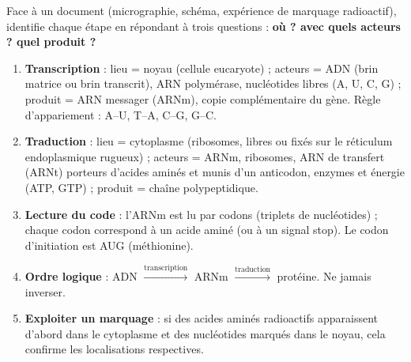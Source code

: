 \documentclass[11pt]{article}
\newcommand{\cle}[1]{{\popxbold\color{popdark}#1}}
\begin{document}
\begin{methode}
Face à un document (micrographie, schéma, expérience de marquage radioactif), identifie chaque étape en répondant à trois questions : \textbf{où ? avec quels acteurs ? quel produit ?}
\begin{enumerate}
\item \textbf{Transcription} : lieu = \cle{noyau} (cellule eucaryote) ; acteurs = ADN (brin matrice ou brin transcrit), \cle{ARN polymérase}, nucléotides libres (A, U, C, G) ; produit = \cle{ARN messager} (ARNm), copie complémentaire du gène. Règle d'appariement : A--U, T--A, C--G, G--C.
\item \textbf{Traduction} : lieu = \cle{cytoplasme} (ribosomes, libres ou fixés sur le réticulum endoplasmique rugueux) ; acteurs = ARNm, \cle{ribosomes}, \cle{ARN de transfert} (ARNt) porteurs d'acides aminés et munis d'un \cle{anticodon}, enzymes et énergie (ATP, GTP) ; produit = \cle{chaîne polypeptidique}.
\item \textbf{Lecture du code} : l'ARNm est lu par \cle{codons} (triplets de nucléotides) ; chaque codon correspond à un acide aminé (ou à un signal stop). Le codon d'initiation est AUG (méthionine).
\item \textbf{Ordre logique} : ADN $\xrightarrow{\text{transcription}}$ ARNm $\xrightarrow{\text{traduction}}$ protéine. Ne jamais inverser.
\item \textbf{Exploiter un marquage} : si des acides aminés radioactifs apparaissent d'abord dans le cytoplasme et des nucléotides marqués dans le noyau, cela confirme les localisations respectives.
\end{enumerate}
\end{methode}
\end{document}
